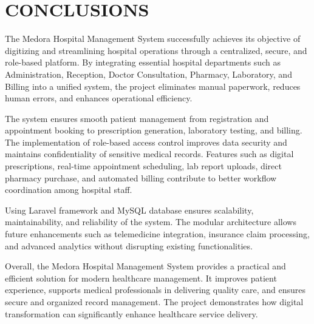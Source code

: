 \chapter{CONCLUSIONS}

The Medora Hospital Management System successfully achieves its objective of digitizing and streamlining hospital operations through a centralized, secure, and role-based platform. By integrating essential hospital departments such as Administration, Reception, Doctor Consultation, Pharmacy, Laboratory, and Billing into a unified system, the project eliminates manual paperwork, reduces human errors, and enhances operational efficiency.

The system ensures smooth patient management from registration and appointment booking to prescription generation, laboratory testing, and billing. The implementation of role-based access control improves data security and maintains confidentiality of sensitive medical records. Features such as digital prescriptions, real-time appointment scheduling, lab report uploads, direct pharmacy purchase, and automated billing contribute to better workflow coordination among hospital staff.

Using Laravel framework and MySQL database ensures scalability, maintainability, and reliability of the system. The modular architecture allows future enhancements such as telemedicine integration, insurance claim processing, and advanced analytics without disrupting existing functionalities.

Overall, the Medora Hospital Management System provides a practical and efficient solution for modern healthcare management. It improves patient experience, supports medical professionals in delivering quality care, and ensures secure and organized record management. The project demonstrates how digital transformation can significantly enhance healthcare service delivery.